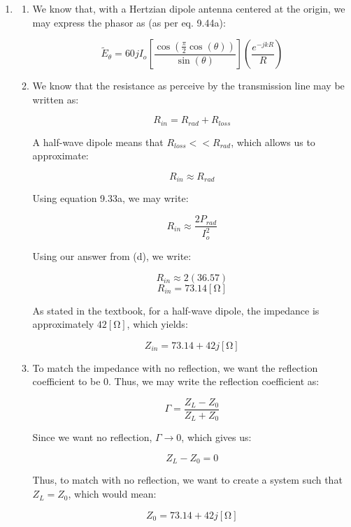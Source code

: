 \begin{enumerate}

  \item 

    \begin{enumerate}

      \item 

        We know that, with a Hertzian dipole antenna centered at the origin, we may express the phasor as (as per eq. 9.44a):

        $$\boxed{\tilde{E}_\theta=60jI_o\left[ \frac{\cos\left( \frac{\pi}{2}\cos(\theta) \right)}{\sin(\theta)} \right]\left( \frac{e^{-jkR}}{R} \right)}$$

      \item 

        We know that the resistance as perceive by the transmission line may be written as:

        $$R_{in}=R_{rad}+R_{loss}$$

        A half-wave dipole means that $R_{loss}<<R_{rad}$, which allows us to approximate:

        $$R_{in}\approx R_{rad}$$

        Using equation 9.33a, we may write:

        $$R_{in}\approx\frac{2P_{rad}}{I_o^2}$$

        Using our answer from (d), we write:

        $$R_{in}\approx 2(36.57)$$
        $$R_{in}=73.14[\si{\ohm}]$$

        As stated in the textbook, for a half-wave dipole, the impedance is approximately $42[\si{\ohm}]$, which yields:

        $$\boxed{Z_{in}=73.14+42j[\si{\ohm}]}$$

      \item 

        To match the impedance with no reflection, we want the reflection coefficient to be 0. Thus, we may write the reflection coefficient as:

        $$\Gamma=\frac{Z_L-Z_0}{Z_L+Z_0}$$

        Since we want no reflection, $\Gamma\to0$, which gives us:

        $$Z_L-Z_0=0$$

        Thus, to match with no reflection, we want to create a system such that $Z_L=Z_0$, which would mean:

        $$\boxed{Z_0=73.14+42j[\si{\ohm}]}$$


\end{enumerate}
\end{enumerate}
